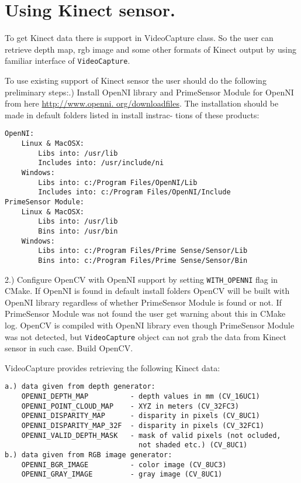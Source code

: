 

\ifCpp
\section{Using Kinect sensor.}
To get Kinect data there is support in VideoCapture class. So the user can retrieve depth map,
rgb image and some other formats of Kinect output by using familiar interface of \texttt{VideoCapture}.\par

To use existing support of Kinect sensor the user should do the following preliminary steps:.) Install OpenNI library and PrimeSensor Module for OpenNI from here \url{http://www.openni.
org/downloadfiles}. The installation should be made in default folders listed in install instrac-
tions of these products:
\begin{lstlisting}
OpenNI:
	Linux & MacOSX:
		Libs into: /usr/lib
		Includes into: /usr/include/ni
	Windows:
		Libs into: c:/Program Files/OpenNI/Lib
		Includes into: c:/Program Files/OpenNI/Include
PrimeSensor Module:
	Linux & MacOSX:
		Libs into: /usr/lib
		Bins into: /usr/bin
	Windows:
		Libs into: c:/Program Files/Prime Sense/Sensor/Lib
		Bins into: c:/Program Files/Prime Sense/Sensor/Bin
\end{lstlisting}
2.) Configure OpenCV with OpenNI support by setting \texttt{WITH\_OPENNI} flag in CMake. If OpenNI
is found in default install folders OpenCV will be built with OpenNI library regardless of whether
PrimeSensor Module is found or not. If PrimeSensor Module was not found the user get warning
about this in CMake log. OpenCV is compiled with OpenNI library even though PrimeSensor
Module was not detected, but \texttt{VideoCapture} object can not grab the data from Kinect sensor in
such case. Build OpenCV.\par

VideoCapture provides retrieving the following Kinect data:
\begin{lstlisting}
a.) data given from depth generator:
	OPENNI_DEPTH_MAP          - depth values in mm (CV_16UC1)
	OPENNI_POINT_CLOUD_MAP    - XYZ in meters (CV_32FC3)
	OPENNI_DISPARITY_MAP      - disparity in pixels (CV_8UC1)
	OPENNI_DISPARITY_MAP_32F  - disparity in pixels (CV_32FC1)
	OPENNI_VALID_DEPTH_MASK   - mask of valid pixels (not ocluded,
                                not shaded etc.) (CV_8UC1)
b.) data given from RGB image generator:
	OPENNI_BGR_IMAGE          - color image (CV_8UC3)
	OPENNI_GRAY_IMAGE         - gray image (CV_8UC1)
\end{lstlisting}


